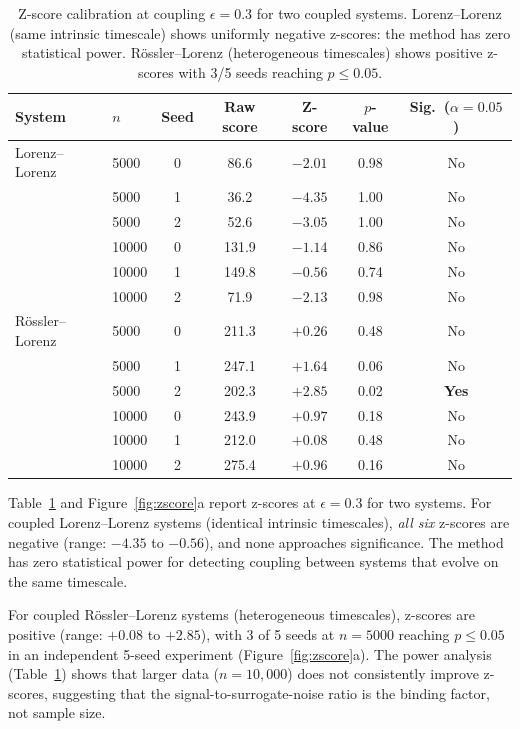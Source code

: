 \documentclass[11pt,a4paper]{article}
\begin{document}
\begin{table}[t]
\centering
\caption{Z-score calibration at coupling $\epsilon = 0.3$ for two coupled systems. Lorenz--Lorenz (same intrinsic timescale) shows uniformly negative z-scores: the method has zero statistical power. R\"ossler--Lorenz (heterogeneous timescales) shows positive z-scores with 3/5 seeds reaching $p \leq 0.05$.}
\label{tab:zscore}
\begin{tabular}{llccccc}
\toprule
System & $n$ & Seed & Raw score & Z-score & $p$-value & Sig.\ ($\alpha = 0.05$) \\
\midrule
Lorenz--Lorenz & 5000 & 0 & 86.6 & $-2.01$ & 0.98 & No \\
               & 5000 & 1 & 36.2 & $-4.35$ & 1.00 & No \\
               & 5000 & 2 & 52.6 & $-3.05$ & 1.00 & No \\
               & 10000 & 0 & 131.9 & $-1.14$ & 0.86 & No \\
               & 10000 & 1 & 149.8 & $-0.56$ & 0.74 & No \\
               & 10000 & 2 & 71.9 & $-2.13$ & 0.98 & No \\
\midrule
R\"ossler--Lorenz & 5000 & 0 & 211.3 & $+0.26$ & 0.48 & No \\
               & 5000 & 1 & 247.1 & $+1.64$ & 0.06 & No \\
               & 5000 & 2 & 202.3 & $+2.85$ & 0.02 & \textbf{Yes} \\
               & 10000 & 0 & 243.9 & $+0.97$ & 0.18 & No \\
               & 10000 & 1 & 212.0 & $+0.08$ & 0.48 & No \\
               & 10000 & 2 & 275.4 & $+0.96$ & 0.16 & No \\
\bottomrule
\end{tabular}
\end{table}

Table~\ref{tab:zscore} and Figure~\ref{fig:zscore}a report z-scores at $\epsilon = 0.3$ for two systems.
For coupled Lorenz--Lorenz systems (identical intrinsic timescales), \emph{all six} z-scores are negative (range: $-4.35$ to $-0.56$), and none approaches significance.
The method has zero statistical power for detecting coupling between systems that evolve on the same timescale.

For coupled R\"ossler--Lorenz systems (heterogeneous timescales), z-scores are positive (range: $+0.08$ to $+2.85$), with 3 of 5 seeds at $n = 5000$ reaching $p \leq 0.05$ in an independent 5-seed experiment (Figure~\ref{fig:zscore}a).
The power analysis (Table~\ref{tab:zscore}) shows that larger data ($n = 10{,}000$) does not consistently improve z-scores, suggesting that the signal-to-surrogate-noise ratio is the binding factor, not sample size.
\end{document}
